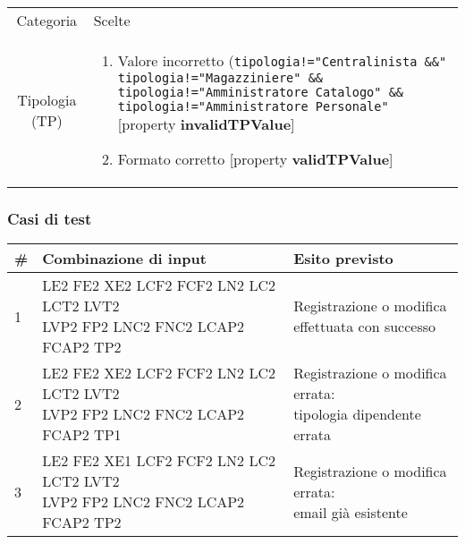 \documentclass[12pt]{article}
\begin{document}
\begin{center}
\begin{tabular}{|c|l|}
\hline
\rowcolor[HTML]{C0C0C0} 
\multicolumn{2}{|c|}{\cellcolor[HTML]{C0C0C0}Parametro: Tipologia dipendente} \\ \hline
\rowcolor[HTML]{C0C0C0} 
\cellcolor[HTML]{C0C0C0}Categoria & Scelte \\ \hline

Tipologia (TP) & \begin{minipage}{11cm}
\begin{enumerate}
\item Valore incorretto (\verb+tipologia!="Centralinista &&"+ \verb+tipologia!="Magazziniere" &&+ \verb+tipologia!="Amministratore Catalogo" &&+ \verb+tipologia!="Amministratore Personale"+ [property \textbf{invalidTPValue}]
\item Formato corretto [property \textbf{validTPValue}]
\end{enumerate}
\end{minipage} \\ \hline

\end{tabular}
\end{center}

\subsubsection{Casi di test}
\begin{center}
\begin{tabular}{|l|l|l|}
\hline
\rowcolor[HTML]{C0C0C0} \textbf{\#} & \textbf{Combinazione di input} & \textbf{Esito previsto}  \\ \hline
1 & \makecell{LE2 FE2 XE2 LCF2 FCF2 LN2 LC2 LCT2 LVT2\\ LVP2 FP2 LNC2 FNC2 LCAP2 FCAP2 TP2} & \makecell{Registrazione o modifica \\ effettuata con successo} \\ \hline
2 & \makecell{LE2 FE2 XE2 LCF2 FCF2 LN2 LC2 LCT2 LVT2\\ LVP2 FP2 LNC2 FNC2 LCAP2 FCAP2 TP1} & \makecell{Registrazione o modifica errata:\\ tipologia dipendente errata} \\ \hline
3 & \makecell{LE2 FE2 XE1 LCF2 FCF2 LN2 LC2 LCT2 LVT2\\ LVP2 FP2 LNC2 FNC2 LCAP2 FCAP2 TP2} & \makecell{Registrazione o modifica errata:\\ email già esistente} \\ \hline
\end{tabular}
\end{center}
\end{document}
